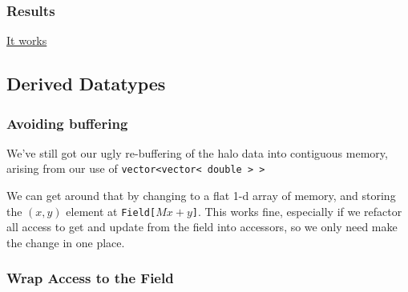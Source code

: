 \subsubsection{Results}\label{results}

\href{https://www.youtube.com/watch?v=3sXO2rYNwl4}{It works}

\subsection{Derived Datatypes}\label{derived-datatypes}

\subsubsection{Avoiding buffering}\label{avoiding-buffering}

We've still got our ugly re-buffering of the halo data into contiguous
memory, arising from our use of
\texttt{vector\textless{}vector\textless{} double \textgreater{} \textgreater{}}

We can get around that by changing to a flat 1-d array of memory, and
storing the $(x,y)$ element at \texttt{Field{[}}$Mx+y$\texttt{{]}}. This
works fine, especially if we refactor all access to get and update from
the field into accessors, so we only need make the change in one place.

\subsubsection{Wrap Access to the Field}\label{wrap-access-to-the-field}

\begin{Shaded}
\begin{Highlighting}[]

   \NormalTok{\{ } 

   

   

   
  \NormalTok{) \{}
    \NormalTok{);}
  \NormalTok{\}}
\NormalTok{\}}
\end{Highlighting}
\end{Shaded}

